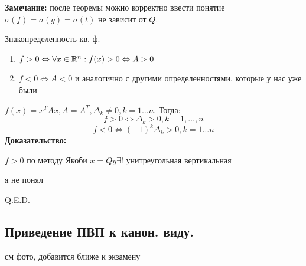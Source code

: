 \textbf{Замечание:} после теоремы можно корректно ввести понятие $\sigma(f)=\sigma(g)= \sigma(t)$ не зависит от $Q$.

 Знакопределенность кв. ф.

\begin{enumerate}
    \item $f > 0 \Leftrightarrow \forall x \in \mathbb{R}^n: f(x)>0 \Leftrightarrow A >0$
    \item $f<0 \Leftrightarrow A<0$
    и аналогично с другими определенностями, которые у нас уже были
\end{enumerate}


$f(x)  = x^T Ax , A = A^T, \Delta_k \neq 0 , k = 1\ldots n$. Тогда:
$$f >0 \Leftrightarrow \Delta_k > 0, k = 1, \ldots, n$$
$$f <0 \Leftrightarrow (-1)^k \Delta_k >0, k = 1\ldots n$$
\textbf{Доказательство:}

$f>0$ по методу Якоби $x = Qy \exists !$ унитреугольная вертикальная

я не понял

\hfill Q.E.D.

\pagebreak


\subsection{Приведение ПВП к канон. виду.}

см фото, добавится ближе к экзамену